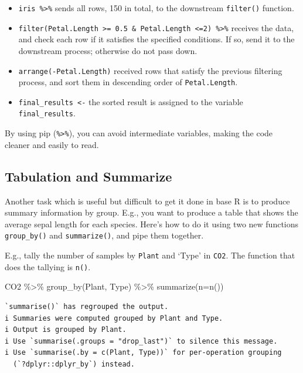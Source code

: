 \documentclass[
  letterpaper,
]{book}
\newenvironment{Shaded}{\begin{snugshade}}{\end{snugshade}}
\newcommand{\AttributeTok}[1]{\textcolor[rgb]{0.40,0.45,0.13}{#1}}
\newcommand{\FunctionTok}[1]{\textcolor[rgb]{0.28,0.35,0.67}{#1}}
\newcommand{\NormalTok}[1]{\textcolor[rgb]{0.00,0.23,0.31}{#1}}
\newcommand{\SpecialCharTok}[1]{\textcolor[rgb]{0.37,0.37,0.37}{#1}}
\begin{document}
\begin{itemize}
\item
  \texttt{iris\ \%\textgreater{}\%} sends all rows, 150 in total, to the
  downstream \texttt{filter()} function.
\item
  \texttt{filter(Petal.Length\ \textgreater{}=\ 0.5\ \&\ Petal.Length\ \textless{}=2)\ \%\textgreater{}\%}
  receives the data, and check each row if it satisfies the specified
  conditions. If so, send it to the downstream process; otherwise do not
  pass down.
\item
  \texttt{arrange(-Petal.Length)} received rows that satisfy the
  previous filtering process, and sort them in descending order of
  \texttt{Petal.Length}.
\item
  \texttt{final\_results\ \textless{}-} the sorted result is assigned to
  the variable \texttt{final\_results}.
\end{itemize}

By using pip (\texttt{\%\textgreater{}\%}), you can avoid intermediate
variables, making the code cleaner and easily to read.

\subsection{Tabulation and Summarize}\label{tidyverse-tabulation}

Another task which is useful but difficult to get it done in base R is
to produce summary information by group. E.g., you want to produce a
table that shows the average sepal length for each species. Here's how
to do it using two new functions \texttt{group\_by()} and
\texttt{summarize()}, and pipe them together.

E.g., tally the number of samples by \texttt{Plant} and `Type' in
\texttt{CO2}. The function that does the tallying is \texttt{n()}.

\begin{Shaded}
\begin{Highlighting}[]
\NormalTok{CO2 }\SpecialCharTok{\%\textgreater{}\%}
  \FunctionTok{group\_by}\NormalTok{(Plant, Type) }\SpecialCharTok{\%\textgreater{}\%}
  \FunctionTok{summarize}\NormalTok{(}\AttributeTok{n=}\FunctionTok{n}\NormalTok{())}
\end{Highlighting}
\end{Shaded}

\begin{verbatim}
`summarise()` has regrouped the output.
i Summaries were computed grouped by Plant and Type.
i Output is grouped by Plant.
i Use `summarise(.groups = "drop_last")` to silence this message.
i Use `summarise(.by = c(Plant, Type))` for per-operation grouping
  (`?dplyr::dplyr_by`) instead.
\end{verbatim}
\end{document}
